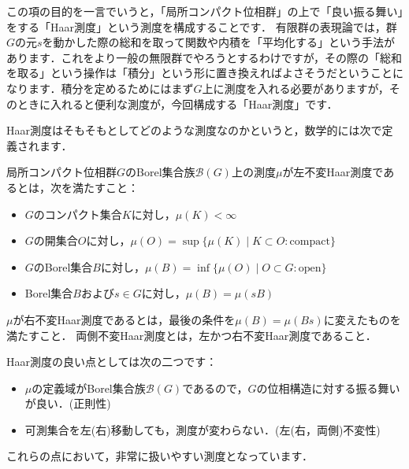

この項の目的を一言でいうと，「局所コンパクト位相群」の上で「良い振る舞い」をする「Haar測度」という測度を構成することです．
有限群の表現論では，群$G$の元$s$を動かした際の総和を取って関数や内積を「平均化する」という手法があります．これをより一般の無限群でやろうとするわけですが，その際の「総和を取る」という操作は「積分」という形に置き換えればよさそうだということになります．積分を定めるためにはまず$G$上に測度を入れる必要がありますが，そのときに入れると便利な測度が，今回構成する「Haar測度」です．

Haar測度はそもそもとしてどのような測度なのかというと，数学的には次で定義されます．
\begin{ydefi}[Haar測度]\label{1}
局所コンパクト位相群$G$のBorel集合族$\mathscr{B}(G)$上の測度$\mu$が左不変Haar測度であるとは，次を満たすこと：
\begin{itemize}
 \item $G$のコンパクト集合$K$に対し，$\mu(K) < \infty$
 \item $G$の開集合$O$に対し，$\mu(O)=\sup \{ \mu(K) \mid K \subset O \colon \mathrm{compact} \}$
 \item $G$のBorel集合$B$に対し，$\mu(B)=\inf \{ \mu(O) \mid O \subset G \colon \mathrm{open} \}$
 \item Borel集合$B$および$s \in G$に対し，$\mu (B) = \mu (sB)$
\end{itemize}
$\mu$が右不変Haar測度であるとは，最後の条件を$\mu (B) = \mu (Bs)$に変えたものを満たすこと．
両側不変Haar測度とは，左かつ右不変Haar測度であること．
\end{ydefi}
Haar測度の良い点としては次の二つです：
\begin{itemize}
 \item $\mu$の定義域がBorel集合族$\mathscr{B}(G)$であるので，$G$の位相構造に対する振る舞いが良い．(正則性)
 \item 可測集合を左(右)移動しても，測度が変わらない．(左(右，両側)不変性)
\end{itemize}
これらの点において，非常に扱いやすい測度となっています．

